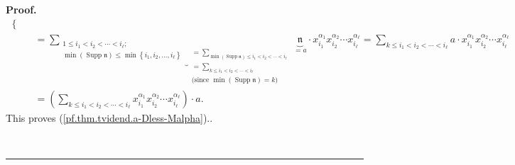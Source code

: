 \documentclass[numbers=enddot,12pt,final,onecolumn,notitlepage,abstracton]{scrartcl}%
\theoremstyle{definition}
\newenvironment{proof}[1][Proof]{\noindent\textbf{#1.} }{\ \rule{0.5em}{0.5em}}
\newenvironment{verlong}{}{}
\let\sumnonlimits\sum
\renewcommand{\sum}{\sumnonlimits\limits}
\begin{document}
\begin{verlong}
\begin{proof}
{\begin{align*}
\begin{cases}
\end{cases}
\\
&  =\underbrace{\sum_{\substack{1\leq i_{1}<i_{2}<\cdots<i_{\ell}%
;\\\min\left(  \operatorname*{Supp}\mathfrak{n}\right)  \leq\min\left\{
i_{1},i_{2},\ldots,i_{\ell}\right\}  }}}_{\substack{=\sum_{\min\left(
\operatorname*{Supp}\mathfrak{n}\right)  \leq i_{1}<i_{2}<\cdots<i_{\ell}%
}\\=\sum_{k\leq i_{1}<i_{2}<\cdots<i_{\ell}}\\\text{(since }\min\left(
\operatorname*{Supp}\mathfrak{n}\right)  =k\text{)}}}\underbrace{\mathfrak{n}%
}_{=a}\cdot x_{i_{1}}^{\alpha_{1}}x_{i_{2}}^{\alpha_{2}}\cdots x_{i_{\ell}%
}^{\alpha_{\ell}}=\sum_{k\leq i_{1}<i_{2}<\cdots<i_{\ell}}a\cdot x_{i_{1}%
}^{\alpha_{1}}x_{i_{2}}^{\alpha_{2}}\cdots x_{i_{\ell}}^{\alpha_{\ell}}\\
&  =\left(  \sum_{k\leq i_{1}<i_{2}<\cdots<i_{\ell}}x_{i_{1}}^{\alpha_{1}%
}x_{i_{2}}^{\alpha_{2}}\cdots x_{i_{\ell}}^{\alpha_{\ell}}\right)  \cdot a.
\end{align*}
This proves (\ref{pf.thm.tvidend.a-Dless-Malpha}).}.


\end{proof}
\end{verlong}
\end{document}
